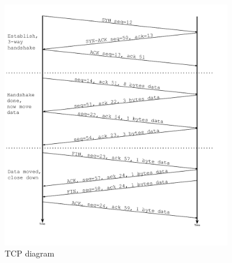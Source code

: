 \begin{description}
\begin{figure}[!h]
        \includegraphics[width=10cm]{131p3-pic}
        \caption{TCP diagram}
        \end{figure}
\end{description}

